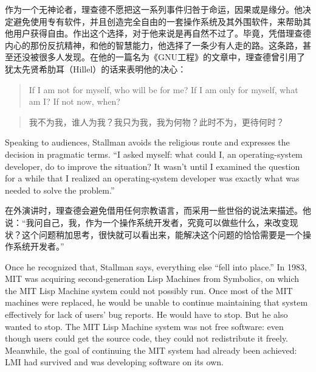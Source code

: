 \ifdefined\chs
作为一个无神论者，理查德不愿把这一系列事件归咎于命运，因果或是缘分。他决定避免使用专有软件，并且创造完全自由的一套操作系统及其外围软件，来帮助其他用户获得自由。作出这个选择，对于他来说是再自然不过了。毕竟，凭借理查德内心的那份反抗精神，和他的智慧能力，他选择了一条少有人走的路。这条路，甚至还没被很多人发现。在他的一篇名为《GNU工程》的文章中，理查德曾引用了犹太先贤希肋耳（Hillel）的话来表明他的决心：
\fi

\ifdefined\eng
\begin{quote}
If I am not for myself, who will be for me? If I am only for myself, what am I? If not now, when?
\end{quote}
\fi

\ifdefined\chs
\begin{quote}
我不为我，谁人为我？我只为我，我为何物？此时不为，更待何时？
\end{quote}
\fi

\ifdefined\eng
Speaking to audiences, Stallman avoids the religious route and expresses the decision in pragmatic terms. ``I asked myself: what could I, an operating-system developer, do to improve the situation? It wasn't until I examined the question for a while that I realized an operating-system developer was exactly what was needed to solve the problem.''
\fi

\ifdefined\chs
在外演讲时，理查德会避免借用任何宗教语言，而采用一些世俗的说法来描述。他说：“我问自己，我，作为一个操作系统开发者，究竟可以做些什么，来改变现状？这个问题稍加思考，很快就可以看出来，能解决这个问题的恰恰需要是一个操作系统开发者。”
\fi

\ifdefined\eng
Once he recognized that, Stallman says, everything else ``fell into place.'' In 1983, MIT was acquiring second-generation Lisp Machines from Symbolics, on which the MIT Lisp Machine system could not possibly run.  Once most of the MIT machines were replaced, he would be unable to continue maintaining that system effectively for lack of users' bug reports.  He would have to stop.  But he also wanted to stop.  The MIT Lisp Machine system was not free software: even though users could get the source code, they could not redistribute it freely.  Meanwhile, the goal of continuing the MIT system had already been achieved: LMI had survived and was developing software on its own.
\fi

